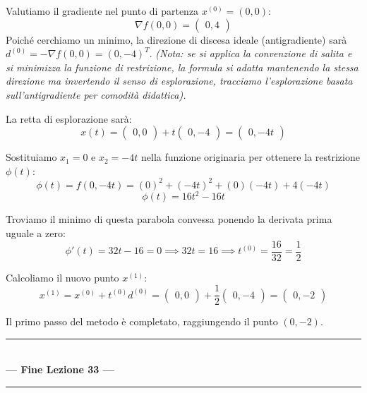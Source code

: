 \documentclass[12pt, a4paper]{article}
\begin{document}
	Valutiamo il gradiente nel punto di partenza $x^{(0)} = (0,0)$:
	\[ \nabla f(0,0) = \begin{pmatrix} 0, 4 \end{pmatrix} \]
	Poiché cerchiamo un minimo, la direzione di discesa ideale (antigradiente) sarà $d^{(0)} = -\nabla f(0,0) = (0, -4)^T$. \textit{(Nota: se si applica la convenzione di salita e si minimizza la funzione di restrizione, la formula si adatta mantenendo la stessa direzione ma invertendo il senso di esplorazione, tracciamo l'esplorazione basata sull'antigradiente per comodità didattica).}
	
	La retta di esplorazione sarà:
	\[ x(t) = \begin{pmatrix} 0, 0 \end{pmatrix} + t \begin{pmatrix} 0, -4 \end{pmatrix} = \begin{pmatrix} 0, -4t \end{pmatrix} \]
	
	Sostituiamo $x_1 = 0$ e $x_2 = -4t$ nella funzione originaria per ottenere la restrizione $\phi(t)$:
	\[ \phi(t) = f(0, -4t) = (0)^2 + (-4t)^2 + (0)(-4t) + 4(-4t) \]
	\[ \phi(t) = 16t^2 - 16t \]
	
	Troviamo il minimo di questa parabola convessa ponendo la derivata prima uguale a zero:
	\[ \phi'(t) = 32t - 16 = 0 \implies 32t = 16 \implies t^{(0)} = \frac{16}{32} = \frac{1}{2} \]
	
	Calcoliamo il nuovo punto $x^{(1)}$:
	\[ x^{(1)} = x^{(0)} + t^{(0)} d^{(0)} = \begin{pmatrix} 0, 0 \end{pmatrix} + \frac{1}{2} \begin{pmatrix} 0, -4 \end{pmatrix} = \begin{pmatrix} 0, -2 \end{pmatrix} \]
	
	Il primo passo del metodo è completato, raggiungendo il punto $(0, -2)$.
	
	\vspace{1.5cm}
	\begin{center}
		\rule{0.65\textwidth}{1pt} \\
		\vspace{0.4cm}
		\textcolor{titlecolor}{\LARGE \textbf{--- Fine Lezione 33 ---}} \\
		\vspace{0.2cm}
		\rule{0.65\textwidth}{1pt}
	\end{center}
	\newpage
	
\end{document}
